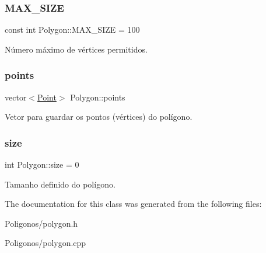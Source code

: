 \subsubsection{\texorpdfstring{M\+A\+X\+\_\+\+S\+I\+ZE}{MAX\_SIZE}}
{\footnotesize\ttfamily const int Polygon\+::\+M\+A\+X\+\_\+\+S\+I\+ZE = 100\hspace{0.3cm}{\ttfamily [protected]}}

Número máximo de vértices permitidos. \mbox{\label{class_polygon_a2d68fb877efd74fd52ea4dea28ea4169}} 
\subsubsection{\texorpdfstring{points}{points}}
{\footnotesize\ttfamily vector$<$\hyperlink{class_point}{Point}$>$ Polygon\+::points\hspace{0.3cm}{\ttfamily [protected]}}

Vetor para guardar os pontos (vértices) do polígono. \mbox{\label{class_polygon_aba87c61b99a3812696145bda9e3f466a}} 
\subsubsection{\texorpdfstring{size}{size}}
{\footnotesize\ttfamily int Polygon\+::size = 0\hspace{0.3cm}{\ttfamily [protected]}}

Tamanho definido do polígono. 

The documentation for this class was generated from the following files\+:\begin{DoxyCompactItemize}
\item 
Poligonos/polygon.\+h\item 
Poligonos/polygon.\+cpp\end{DoxyCompactItemize}
